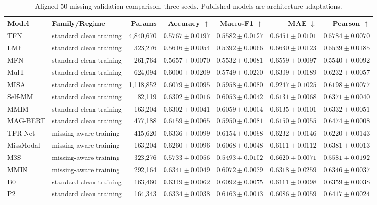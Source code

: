 \begin{table}[t]
\centering
\small
\begin{tabular}{llrrrrr}
\toprule
Model & Family/Regime & Params & Accuracy $\uparrow$ & Macro-F1 $\uparrow$ & MAE $\downarrow$ & Pearson $\uparrow$ \\
\midrule
TFN & standard clean training & 4,840,670 & $0.5767\pm0.0197$ & $0.5582\pm0.0127$ & $0.6451\pm0.0101$ & $0.5784\pm0.0070$ \\
LMF & standard clean training & 323,276 & $0.5616\pm0.0054$ & $0.5392\pm0.0066$ & $0.6630\pm0.0123$ & $0.5539\pm0.0185$ \\
MFN & standard clean training & 261,764 & $0.5657\pm0.0070$ & $0.5532\pm0.0081$ & $0.6559\pm0.0097$ & $0.5540\pm0.0092$ \\
MulT & standard clean training & 624,094 & $0.6000\pm0.0209$ & $0.5749\pm0.0230$ & $0.6309\pm0.0189$ & $0.6232\pm0.0057$ \\
MISA & standard clean training & 1,118,852 & $0.6079\pm0.0095$ & $0.5958\pm0.0080$ & $0.9247\pm0.1025$ & $0.6198\pm0.0077$ \\
Self-MM & standard clean training & 82,119 & $0.6302\pm0.0016$ & $0.6053\pm0.0042$ & $0.6131\pm0.0068$ & $0.6371\pm0.0040$ \\
MMIM & standard clean training & 163,204 & $0.6302\pm0.0041$ & $0.6059\pm0.0004$ & $0.6135\pm0.0101$ & $0.6332\pm0.0051$ \\
MAG-BERT & standard clean training & 477,188 & $0.6159\pm0.0065$ & $0.5950\pm0.0081$ & $0.6150\pm0.0055$ & $0.6474\pm0.0008$ \\
TFR-Net & missing-aware training & 415,620 & $0.6336\pm0.0099$ & $0.6154\pm0.0098$ & $0.6232\pm0.0146$ & $0.6220\pm0.0143$ \\
MissModal & missing-aware training & 163,204 & $0.6260\pm0.0096$ & $0.6068\pm0.0048$ & $0.6111\pm0.0112$ & $0.6381\pm0.0013$ \\
M3S & missing-aware training & 323,276 & $0.5733\pm0.0056$ & $0.5493\pm0.0102$ & $0.6620\pm0.0071$ & $0.5581\pm0.0192$ \\
MMIN & missing-aware training & 292,164 & $0.6341\pm0.0049$ & $0.6072\pm0.0039$ & $0.6318\pm0.0259$ & $0.6346\pm0.0037$ \\
B0 & standard clean training & 163,460 & $0.6349\pm0.0062$ & $0.6092\pm0.0075$ & $0.6111\pm0.0098$ & $0.6359\pm0.0038$ \\
P2 & standard clean training & 164,343 & $0.6334\pm0.0038$ & $0.6163\pm0.0013$ & $0.6086\pm0.0059$ & $0.6417\pm0.0024$ \\
\bottomrule
\end{tabular}
\caption{Aligned-50 missing validation comparison, three seeds. Published models are architecture adaptations.}
\label{tab:q2_expanded_missing}
\end{table}
